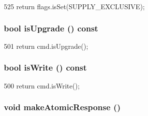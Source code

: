 \begin{DoxyCode}
525 { return flags.isSet(SUPPLY_EXCLUSIVE); }
\end{DoxyCode}
\hypertarget{classPacket_aadb2fde0aba4a65b45d591e9ef5b6a63}{
\subsubsection[{isUpgrade}]{\setlength{\rightskip}{0pt plus 5cm}bool isUpgrade () const}}
\label{classPacket_aadb2fde0aba4a65b45d591e9ef5b6a63}



\begin{DoxyCode}
501 { return cmd.isUpgrade(); }
\end{DoxyCode}
\hypertarget{classPacket_ab699d2f0d186312531fd1c279fd27b73}{
\subsubsection[{isWrite}]{\setlength{\rightskip}{0pt plus 5cm}bool isWrite () const}}
\label{classPacket_ab699d2f0d186312531fd1c279fd27b73}



\begin{DoxyCode}
500 { return cmd.isWrite(); }
\end{DoxyCode}
\hypertarget{classPacket_ad664e704f09d6bb5c116573721034ebd}{
\subsubsection[{makeAtomicResponse}]{\setlength{\rightskip}{0pt plus 5cm}void makeAtomicResponse ()}}
\label{classPacket_ad664e704f09d6bb5c116573721034ebd}



